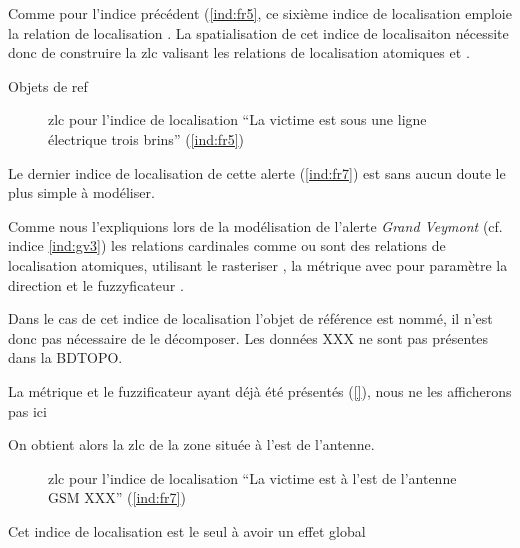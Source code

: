 Comme pour l'indice précédent (\ref{ind:fr5}, ce sixième indice de
localisation emploie la relation de localisation
.
%
La spatialisation de cet indice de localisaiton nécessite donc de
construire la \ac{zlc} valisant les relations de localisation
atomiques  et .

Objets de ref

\begin{figure}
  \centering
  
  \caption{\ac{zlc} pour l'indice de localisation \enquote{La victime
      est sous une ligne électrique trois brins} (\ref{ind:fr5})}
\end{figure}



Le dernier indice de localisation de cette alerte (\ref{ind:fr7}) est
sans aucun doute le plus simple à modéliser.

Comme nous l'expliquions lors de la modélisation de l'alerte
\emph{Grand Veymont} (cf. indice \ref{ind:gv3}) les relations
cardinales comme  ou 
sont des relations de localisation atomiques, utilisant le rasteriser
, la métrique \onto[orla]{} avec pour paramètre
la direction et le fuzzyficateur .

Dans le cas de cet indice de localisation l'objet de référence est
nommé, il n'est donc pas nécessaire de le décomposer.
%
Les données XXX ne sont pas présentes dans la BDTOPO.

La métrique \onto[orla]{} et le fuzzificateur 
ayant déjà été présentés (\autoref{}), nous ne les afficherons pas ici

On obtient alors la \ac{zlc} de la zone située à l'est de l'antenne.

\begin{figure}
  \centering
  
  \caption{\ac{zlc} pour l'indice de localisation \enquote{La victime
      est à l'est de l'antenne GSM XXX} (\ref{ind:fr7})}
\end{figure}

Cet indice de localisation est le seul à avoir un effet global


